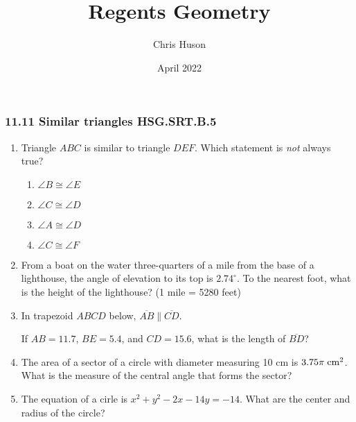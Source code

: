 \documentclass[12pt, oneside]{article}
\title{Regents Geometry}
\author{Chris Huson}
\date{April 2022}
\begin{document}
\subsubsection*{11.11 Similar triangles \hfill HSG.SRT.B.5}
\begin{enumerate}[itemsep=1.7cm]
\item Triangle $ABC$ is similar to triangle $DEF$. Which statement is \emph{not}
always true?
\begin{multicols}{2}
  \begin{enumerate}
    \item $\angle B \cong \angle E$
    \item $\angle C \cong \angle D$ 
    \item $\angle A \cong \angle D$
    \item $\angle C \cong \angle F$
  \end{enumerate}
\end{multicols}


\item From a boat on the water three-quarters of a mile from the base of a lighthouse, the angle of elevation to its top is $2.74^\circ$. To the nearest foot, what is the height of the lighthouse? (1 mile = 5280 feet)
\vspace{1cm}

\item In trapezoid $ABCD$ below, $\overline{AB} \parallel \overline{CD}$.
\begin{center}
  \end{center}
If $AB=11.7$, $BE=5.4$, and $CD=15.6$, what is the length of $\overline{BD}$?
\vspace{1cm}

\item The area of a sector of a circle with diameter measuring 10 cm is $3.75\pi \; \rm{cm}^2$. What is the measure of the central angle that forms the sector?

\newpage
\item The equation of a cirle is $x^2+y^2-2x-14y=-14$. What are the center and radius of the circle? \vspace{1cm}


\end{enumerate}
\end{document}
